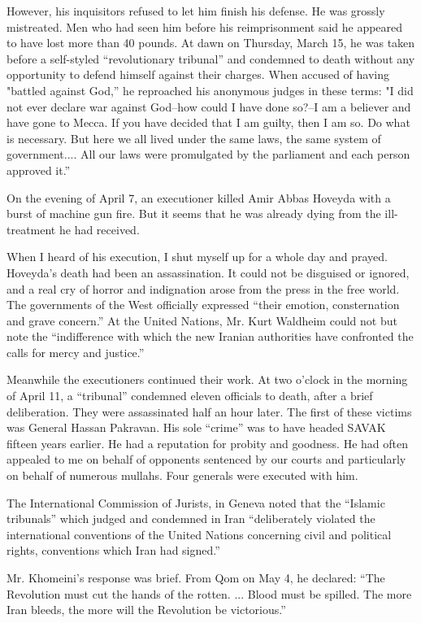 However, his inquisitors refused to let him finish his defense. He was grossly mistreated. Men who had seen him before his reimprisonment said he appeared to have lost more than 40 pounds. At dawn on Thursday, March 15, he was taken before a self-styled “revolutionary tribunal” and condemned to death without any opportunity to defend himself against their charges. When accused of having "battled against God,” he reproached his anonymous judges in these terms: "I did not ever declare war against God--how could I have done so?--I am a believer and have gone to Mecca. If you have decided that I am guilty, then I am so. Do what is necessary. But here we all lived under the same laws, the same system of government.... All our laws were promulgated by the parliament and each person approved it.” 

On the evening of April 7, an executioner killed Amir Abbas Hoveyda with a burst of machine gun fire. But it seems that he was already dying from the ill-treatment he had received. 

When I heard of his execution, I shut myself up for a whole day and prayed. Hoveyda's death had been an assassination. It could not be disguised or ignored, and a real cry of horror and indignation arose from the press in the free world. The governments of the West officially expressed “their emotion, consternation and grave concern.” At the United Nations, Mr. Kurt Waldheim could not but note the “indifference with which the new Iranian authorities have confronted the calls for mercy and justice.” 

Meanwhile the executioners continued their work. At two o'clock in the morning of April 11, a “tribunal” condemned eleven officials to death, after a brief deliberation. They were assassinated half an hour later. The first of these victims was General Hassan Pakravan. His sole “crime” was to have headed SAVAK fifteen years earlier. He had a reputation for probity and goodness. He had often appealed to me on behalf of opponents sentenced by our courts and particularly on behalf of numerous mullahs. Four generals were executed with him. 

The International Commission of Jurists, in Geneva noted that the “Islamic tribunals” which judged and condemned in Iran “deliberately violated the international conventions of the United Nations concerning civil and political rights, conventions which Iran had signed.” 

Mr. Khomeini's response was brief. From Qom on May 4, he declared: “The Revolution must cut the hands of the rotten. ... Blood must be spilled. The more Iran bleeds, the more will the Revolution be victorious.” 

